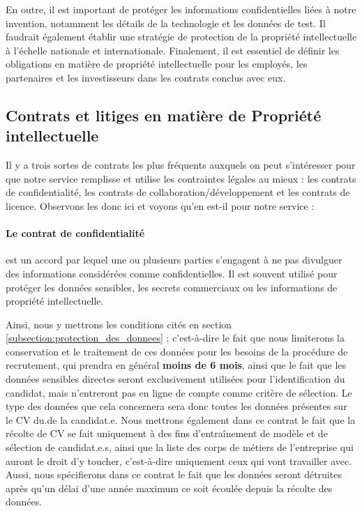  En outre, il est important de protéger les informations confidentielles liées à notre invention, notamment les détails de la technologie et les données de test. Il faudrait également établir une stratégie de protection de la propriété intellectuelle à l'échelle nationale et internationale. Finalement, il est essentiel de définir les obligations en matière de propriété intellectuelle pour les employés, les partenaires et les investisseurs dans les contrats conclus avec eux.

\subsection{Contrats et litiges en matière de Propriété intellectuelle}

Il y a trois sortes de contrats les plus fréquents auxquels on peut s'intéresser pour que notre service remplisse et utilise les contraintes légales au mieux : les contrats de confidentialité, les contrats de collaboration/développement et les contrats de licence. Observons les donc ici et voyons qu'en est-il pour notre service : 

\paragraph{Le contrat de confidentialité} est un accord par lequel une ou plusieurs parties s'engagent à ne pas divulguer des informations considérées comme confidentielles. Il est souvent utilisé pour protéger les données sensibles, les secrets commerciaux ou les informations de propriété intellectuelle.

Ainsi, nous y mettrons les conditions cités en section \ref{subsection:protection_des_donnees} ; c'est-à-dire le fait que nous limiterons la conservation et le traitement de ces données  pour les besoins de la procédure de recrutement, qui prendra en général \textbf{moins de 6 mois}, ainsi que le fait que les données sensibles directes seront exclusivement utilisées pour l'identification du candidat, mais n'entreront pas en ligne de compte comme critère de sélection. Le type des données que cela concernera sera donc toutes les données présentes sur le CV du.de la candidat.e. Nous mettrons également dans ce contrat le fait que la récolte de CV se fait uniquement à des fins d'entraînement de modèle et de sélection de candidat.e.s, ainsi que la liste des corps de métiers de l'entreprise qui auront le droit d'y toucher, c'est-à-dire uniquement ceux qui vont travailler avec. \newline
Aussi, nous spécifierons dans ce contrat le fait que les données seront détruites après qu'un délai d'une année maximum ce soit écoulée depuis la récolte des données.

